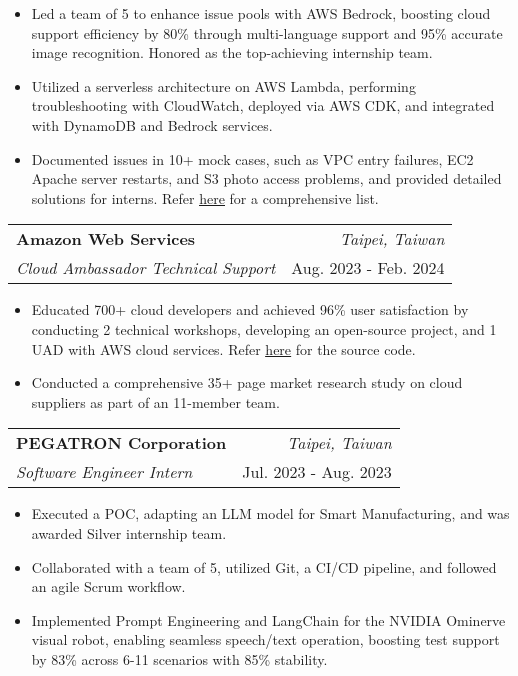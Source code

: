 \documentclass[a4paper, 11pt]{article}
\makeatletter
\newcommand{\resumeSubheading}[4]{
\vspace{0.5mm}\item[]
    \begin{tabular*}{0.98\textwidth}[t]{l@{\extracolsep{\fill}}r}
        \textbf{#1} & \textit{\footnotesize{#4}} \\
        \textit{\footnotesize{#3}} &  \footnotesize{#2}\\
    \end{tabular*}
    \vspace{-2.4mm}
}
\newcommand{\resumeItemListStart}{
    \begin{justify}\begin{itemize}[
        leftmargin=3ex, 
        rightmargin=2ex, 
        noitemsep,
        labelsep=1.2mm,
        itemsep=0.5mm
    ]\small
}
\newcommand{\resumeItemListEnd}{
    \end{itemize}\end{justify}\vspace{-2mm}
}
\makeatother
\begin{document}
        \vspace{-1.0mm}

        \resumeItemListStart
            \item {Led a team of 5 to enhance issue pools with AWS Bedrock, boosting cloud support efficiency by 80\% through multi-language support and 95\% accurate image recognition. Honored as the top-achieving internship team.}
            \item {Utilized a serverless architecture on AWS Lambda, performing troubleshooting with CloudWatch, deployed via AWS CDK, and integrated with DynamoDB and Bedrock services.}
            \item {Documented issues in 10+ mock cases, such as VPC entry failures, EC2 Apache server restarts, and S3 photo access problems, and provided detailed solutions for interns. Refer \href{https://github.com/1chooo/ecv-training-materials/tree/main/msp/aws_challenge}{\underline{here}} for a comprehensive list.}
        \resumeItemListEnd

    \vspace{-1.0mm}
    
    \resumeSubheading
        {Amazon Web Services}
        {Aug. 2023 - Feb. 2024}
        {Cloud Ambassador Technical Support}
        {\textcolor{gray}{\footnotesize{\faMapMarker}} Taipei, Taiwan}

        \vspace{-1.0mm}

        \resumeItemListStart
            \item Educated 700+ cloud developers and achieved 96\% user satisfaction by conducting 2 technical workshops, developing an open-source project, and 1 UAD with AWS cloud services. Refer \href{https://github.com/aws-educate-tw/aws-line-business-card-workshop}{\underline{here}} for the source code.
            \item {Conducted a comprehensive 35+ page market research study on cloud suppliers as part of an 11-member team.}
        \resumeItemListEnd

    \vspace{-1.0mm}
    
    \resumeSubheading
        {PEGATRON Corporation}
        {Jul. 2023 - Aug. 2023}
        {Software Engineer Intern}
        {\textcolor{gray}{\footnotesize{\faMapMarker}} Taipei, Taiwan}
            
        \vspace{-1.0mm}
        
        \resumeItemListStart
            \item {Executed a POC, adapting an LLM model for Smart Manufacturing, and was awarded Silver internship team.}
            \item {Collaborated with a team of 5, utilized Git, a CI/CD pipeline, and followed an agile Scrum workflow.}
            \item {Implemented {Prompt Engineering} and {LangChain} for the {NVIDIA Ominerve visual robot}, enabling seamless speech/text operation, boosting test support by {83\%} across {6-11} scenarios with {85\%} stability.}
        \resumeItemListEnd
\end{document}
